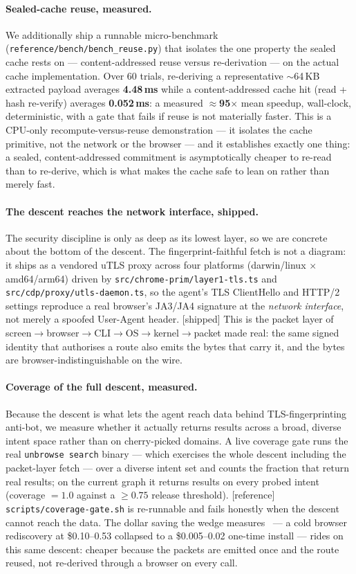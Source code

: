 \documentclass[11pt]{article}
\newcommand{\impl}{\textcolor{green!55!black}{\small[shipped]}}
\newcommand{\refimpl}{\textcolor{blue!70!black}{\small[reference]}}
\begin{document}
\paragraph{Sealed-cache reuse, measured.} We additionally ship a runnable
micro-benchmark (\texttt{reference/bench/\allowbreak bench\_reuse.py}) that isolates the one
property the sealed cache rests on --- content-addressed reuse versus re-derivation
--- on the actual cache implementation. Over 60 trials, re-deriving a representative
$\sim$64\,KB extracted payload averages \textbf{4.48\,ms} while a content-addressed
cache hit (read + hash re-verify) averages \textbf{0.052\,ms}: a measured
\textbf{$\approx$95$\times$} mean speedup, wall-clock, deterministic, with a gate
that fails if reuse is not materially faster. This is a CPU-only
recompute-versus-reuse demonstration --- it isolates the cache primitive, not the
network or the browser --- and it establishes exactly one thing: a sealed,
content-addressed commitment is asymptotically cheaper to re-read than to
re-derive, which is what makes the cache safe to lean on rather than merely fast.

\paragraph{The descent reaches the network interface, shipped.} The security
discipline is only as deep as its lowest layer, so we are concrete about the bottom
of the descent. The fingerprint-faithful fetch is not a diagram: it ships as a
vendored uTLS proxy across four platforms (darwin/linux $\times$ amd64/arm64) driven
by \texttt{src/chrome-prim/layer1-tls.ts} and \texttt{src/cdp/proxy/utls-daemon.ts},
so the agent's TLS ClientHello and HTTP/2 settings reproduce a real browser's JA3/JA4
signature at the \emph{network interface}, not merely a spoofed User-Agent header.
\impl{} This is the packet layer of
screen$\to$browser$\to$CLI$\to$OS$\to$kernel$\to$packet made real: the same signed
identity that authorises a route also emits the bytes that carry it, and the bytes
are browser-indistinguishable on the wire.

\paragraph{Coverage of the full descent, measured.} Because the descent is what lets
the agent reach data behind TLS-fingerprinting anti-bot, we measure whether it
actually returns results across a broad, diverse intent space rather than on
cherry-picked domains. A live coverage gate runs the real \texttt{unbrowse search}
binary --- which exercises the whole descent including the packet-layer fetch ---
over a diverse intent set and counts the fraction that return real results; on the
current graph it returns results on every probed intent (coverage $=1.0$ against a
$\geq 0.75$ release threshold). \refimpl{} \texttt{scripts/coverage-gate.sh} is
re-runnable and fails honestly when the descent cannot reach the data. The dollar
saving the wedge measures~\cite{wedge} --- a cold browser rediscovery at
\$0.10--0.53 collapsed to a \$0.005--0.02 one-time install --- rides on this same
descent: cheaper because the packets are emitted once and the route reused, not
re-derived through a browser on every call.
\end{document}
